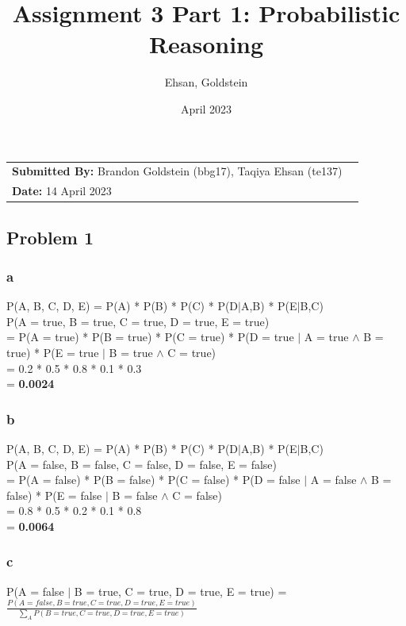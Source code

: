 \documentclass{article}
\title{\textbf{Assignment 3 Part 1:} Probabilistic Reasoning}
\author{Ehsan, Goldstein}
\date{April 2023}
\begin{document}
\maketitle

\noindent\begin{tabular}{@{}ll}
    \textbf{Submitted By: }Brandon Goldstein (bbg17), Taqiya Ehsan (te137)\\
     \textbf{Date:} 14 April 2023
\end{tabular}

\subsection*{Problem 1}
\subsubsection*{a} P(A, B, C, D, E) = P(A) * P(B) * P(C) * P(D$\vert$A,B) * P(E$\vert$B,C) \\

\noindent
P(A = true, B = true, C = true, D = true, E = true) \\
\indent 
= P(A = true) * P(B = true) * P(C = true) * P(D = true $\vert$ A = true $\land$ B = true) * P(E = true $\vert$ B = true $\land$ C = true) \\ 
\indent
= 0.2 * 0.5 * 0.8 * 0.1 * 0.3 \\
\indent 
= \textbf{0.0024}

\subsubsection*{b} P(A, B, C, D, E) = P(A) * P(B) * P(C) * P(D$\vert$A,B) * P(E$\vert$B,C) \\

\noindent
P(A = false, B = false, C = false, D = false, E = false) \\
\indent 
= P(A = false) * P(B = false) * P(C = false) * P(D = false $\vert$ A = false $\land$ B = false) * P(E = false $\vert$ B = false $\land$ C = false) \\
\indent
= 0.8 * 0.5 * 0.2 * 0.1 * 0.8 \\
\indent 
= \textbf{0.0064}

\subsubsection*{c} P(A = false $\vert$ B = true, C = true, D = true, E = true) = $\frac{P(A = false, B = true, C = true, D = true, E = true)}{\sum_{A} P(B = true, C = true, D = true, E = true)}$ \\
\end{document}
